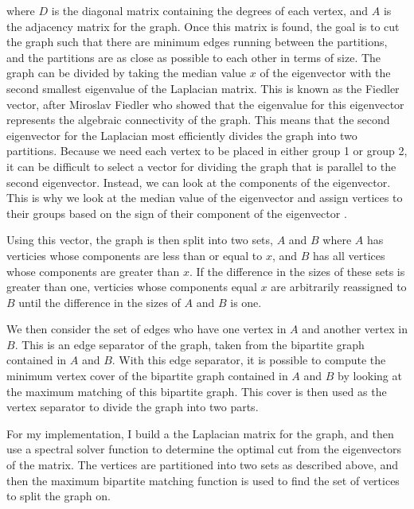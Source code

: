 \documentclass{article}
\begin{document}
    where $D$ is the diagonal matrix containing the degrees of each vertex, and $A$ is the adjacency matrix for the graph. Once this matrix is found, the goal is to cut the graph such that there are minimum edges running between the partitions, and the partitions are as close as possible to each other in terms of size. The graph can be divided by taking the median value $x$ of the eigenvector with the second smallest eigenvalue of the Laplacian matrix. This is known as the Fiedler vector, after Miroslav Fiedler who showed that the eigenvalue for this eigenvector represents the algebraic connectivity of the graph. This means that the second eigenvector for the Laplacian most efficiently divides the graph into two partitions. Because we need each vertex to be placed in either group 1 or group 2, it can be difficult to select a vector for dividing the graph that is parallel to the second eigenvector. Instead, we can look at the components of the eigenvector. This is why we look at the median value of the eigenvector and assign vertices to their groups based on the sign of their component of the eigenvector \cite{Newman2006.2}.
    \par
    Using this vector, the graph is then split into two sets, $A$ and $B$ where $A$ has verticies whose components are less than or equal to $x$, and $B$ has all vertices whose components are greater than $x$. If the difference in the sizes of these sets is greater than one, verticies whose components equal $x$ are arbitrarily reassigned to $B$ until the difference in the sizes of $A$ and $B$ is one.
    \par
    We then consider the set of edges who have one vertex in $A$ and another vertex in $B$. This is an edge separator of the graph, taken from the bipartite graph contained in $A$ and $B$. With this edge separator, it is possible to compute the minimum vertex cover of the bipartite graph contained in $A$ and $B$ by looking at the maximum matching of this bipartite graph. This cover is then used as the vertex separator to divide the graph into two parts.
    \par
    For my implementation, I build a the Laplacian matrix for the graph, and then use a spectral solver function to determine the optimal cut from the eigenvectors of the matrix. The vertices are partitioned into two sets as described above, and then the maximum bipartite matching function is used to find the set of vertices to split the graph on.
\end{document}
